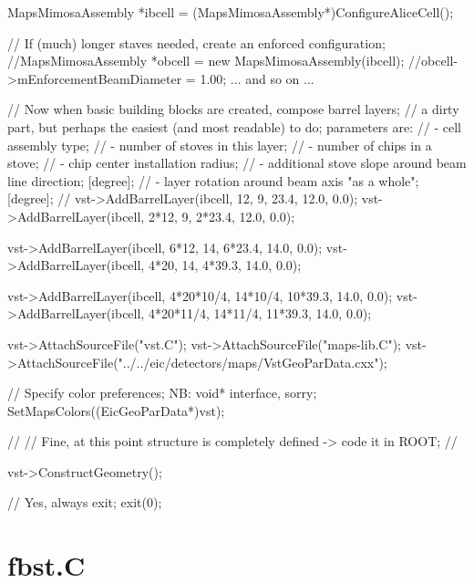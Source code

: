 \documentclass[12pt]{article}
\begin{document}
\begin{tcolorbox}
\begin{verbnobox}[\tiny]
{  MapsMimosaAssembly *ibcell = (MapsMimosaAssembly*)ConfigureAliceCell();

  // If (much) longer staves needed, create an enforced configuration;
  //MapsMimosaAssembly *obcell = new MapsMimosaAssembly(ibcell);
  //obcell->mEnforcementBeamDiameter     =    1.00; ... and so on ...

  // Now when basic building blocks are created, compose barrel layers;
  // a dirty part, but perhaps the easiest (and most readable) to do; parameters are:
  //  - cell assembly type;
  //  - number of stoves in this layer;
  //  - number of chips in a stove;
  //  - chip center installation radius;
  //  - additional stove slope around beam line direction; [degree];
  //  - layer rotation around beam axis "as a whole"; [degree];
  //
  vst->AddBarrelLayer(ibcell,   12,  9,   23.4, 12.0, 0.0);
  vst->AddBarrelLayer(ibcell, 2*12,  9, 2*23.4, 12.0, 0.0);

  vst->AddBarrelLayer(ibcell, 6*12, 14, 6*23.4, 14.0, 0.0);
  vst->AddBarrelLayer(ibcell, 4*20, 14, 4*39.3, 14.0, 0.0);

  vst->AddBarrelLayer(ibcell, 4*20*10/4, 14*10/4, 10*39.3, 14.0, 0.0);
  vst->AddBarrelLayer(ibcell, 4*20*11/4, 14*11/4, 11*39.3, 14.0, 0.0);

  vst->AttachSourceFile("vst.C");
  vst->AttachSourceFile("maps-lib.C");
  vst->AttachSourceFile("../../eic/detectors/maps/VstGeoParData.cxx");

  // Specify color preferences; NB: void* interface, sorry;
  SetMapsColors((EicGeoParData*)vst);

  //
  // Fine, at this point structure is completely defined -> code it in ROOT;
  //

  vst->ConstructGeometry();

  // Yes, always exit;
  exit(0);
}
\end{verbnobox}  
\end{tcolorbox}

\pagebreak
\section{fbst.C}
\end{document}
